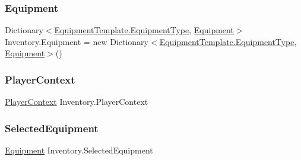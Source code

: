 \mbox{\label{class_inventory_add0863c4388ed45e0747c055ef80f1ad}} 
\subsubsection{\texorpdfstring{Equipment}{Equipment}}
{\footnotesize\ttfamily Dictionary$<$\mbox{\hyperlink{class_equipment_template_ad390a9e6257d1d050f5d5fb5a8756633}{Equipment\+Template.\+Equipment\+Type}}, \mbox{\hyperlink{class_equipment}{Equipment}}$>$ Inventory.\+Equipment = new Dictionary$<$\mbox{\hyperlink{class_equipment_template_ad390a9e6257d1d050f5d5fb5a8756633}{Equipment\+Template.\+Equipment\+Type}}, \mbox{\hyperlink{class_equipment}{Equipment}}$>$()\hspace{0.3cm}{\ttfamily [get]}}

\mbox{\label{class_inventory_a3ea6a5ffe1baad0e490450748024fd30}} 
\subsubsection{\texorpdfstring{Player\+Context}{PlayerContext}}
{\footnotesize\ttfamily \mbox{\hyperlink{class_player_context}{Player\+Context}} Inventory.\+Player\+Context\hspace{0.3cm}{\ttfamily [get]}}

\mbox{\label{class_inventory_a174fcd1df7a1ddd591b97e4add4c0800}} 
\subsubsection{\texorpdfstring{Selected\+Equipment}{SelectedEquipment}}
{\footnotesize\ttfamily \mbox{\hyperlink{class_equipment}{Equipment}} Inventory.\+Selected\+Equipment\hspace{0.3cm}{\ttfamily [get]}}

\mbox{\label{class_inventory_adebbb0904a72afb32ccef951f45e49ed}} 
